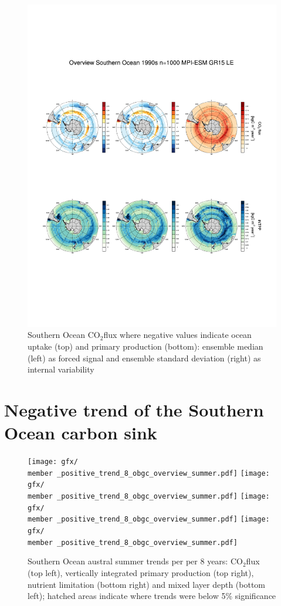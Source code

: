 \begin{figure}[h]
\includegraphics[scale=.9,trim=7.2cm 6.3cm 0cm 16cm,clip]{gfx/Overview_SO_co2flux_intpp_ens_t1990s.pdf} %
\caption{Southern Ocean CO$_2$flux where negative values indicate ocean uptake (top) and primary production (bottom): ensemble median (left) as forced signal and ensemble standard deviation (right) as internal variability}
\label{fig:SOCS_ensmean_ensstd}
\end{figure}




\section{Negative trend of the Southern Ocean carbon sink}

\begin{figure}[h]
\texttt{[image: gfx/\\member \_positive\_trend\_8\_obgc\_overview\_summer.pdf]} %
\texttt{[image: gfx/\\member \_positive\_trend\_8\_obgc\_overview\_summer.pdf]} %
\texttt{[image: gfx/\\member \_positive\_trend\_8\_obgc\_overview\_summer.pdf]} %
\texttt{[image: gfx/\\member \_positive\_trend\_8\_obgc\_overview\_summer.pdf]} %
\caption{Southern Ocean austral summer trends per per 8 years: CO$_2$flux (top left), vertically integrated primary production (top right), nutrient limitation (bottom right) and mixed layer depth (bottom left); hatched areas indicate where trends were below 5\% significance}
\label{fig:co2flux_intpp}
\end{figure}

